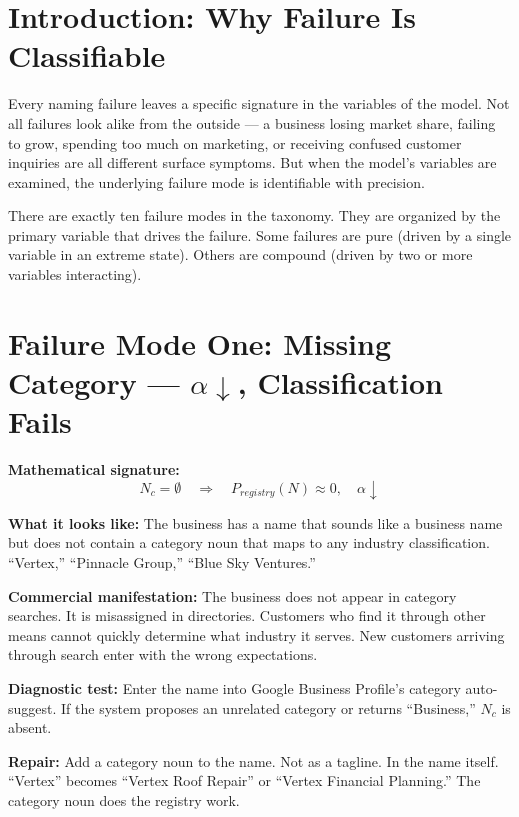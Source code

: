 \documentclass[12pt, openany]{book}
\theoremstyle{thmstyle}
\theoremstyle{defstyle}
\begin{document}
\section{Introduction: Why Failure Is Classifiable}

Every naming failure leaves a specific signature in the variables of the model. Not all failures look alike from the outside --- a business losing market share, failing to grow, spending too much on marketing, or receiving confused customer inquiries are all different surface symptoms. But when the model's variables are examined, the underlying failure mode is identifiable with precision.

There are exactly ten failure modes in the taxonomy. They are organized by the primary variable that drives the failure. Some failures are pure (driven by a single variable in an extreme state). Others are compound (driven by two or more variables interacting).

\section{Failure Mode One: Missing Category --- $\alpha\downarrow$, Classification Fails}

\begin{failbox}
\textbf{Mathematical signature:}
\[
N_c = \emptyset \quad \Rightarrow \quad P_{registry}(N) \approx 0, \quad \alpha \downarrow
\]

\textbf{What it looks like:} The business has a name that sounds like a business name but does not contain a category noun that maps to any industry classification. ``Vertex,'' ``Pinnacle Group,'' ``Blue Sky Ventures.''

\textbf{Commercial manifestation:} The business does not appear in category searches. It is misassigned in directories. Customers who find it through other means cannot quickly determine what industry it serves. New customers arriving through search enter with the wrong expectations.

\textbf{Diagnostic test:} Enter the name into Google Business Profile's category auto-suggest. If the system proposes an unrelated category or returns ``Business,'' $N_c$ is absent.

\textbf{Repair:} Add a category noun to the name. Not as a tagline. In the name itself. ``Vertex'' becomes ``Vertex Roof Repair'' or ``Vertex Financial Planning.'' The category noun does the registry work.
\end{failbox}
\end{document}
